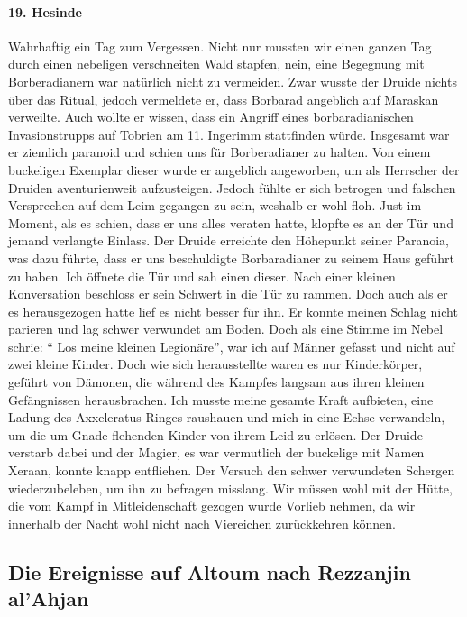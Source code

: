 \paragraph{19. Hesinde}
Wahrhaftig ein Tag zum Vergessen. Nicht nur mussten wir einen ganzen Tag durch einen nebeligen verschneiten Wald stapfen, nein, eine Begegnung mit Borberadianern war natürlich nicht zu vermeiden. Zwar wusste der Druide nichts über das Ritual, jedoch vermeldete er, dass Borbarad angeblich auf Maraskan verweilte. Auch wollte er wissen, dass ein Angriff eines borbaradianischen Invasionstrupps auf Tobrien am 11. Ingerimm stattfinden würde. Insgesamt war er ziemlich paranoid und schien uns für Borberadianer zu halten. Von einem buckeligen Exemplar dieser wurde er angeblich angeworben, um als Herrscher der Druiden aventurienweit aufzusteigen. Jedoch fühlte er sich betrogen und falschen Versprechen auf dem Leim gegangen zu sein, weshalb er wohl floh. Just im Moment, als es schien, dass er uns alles veraten hatte, klopfte es an der Tür und jemand verlangte Einlass. Der Druide erreichte den Höhepunkt seiner Paranoia, was dazu führte, dass er uns beschuldigte Borbaradianer zu seinem Haus geführt zu haben. Ich öffnete die Tür und sah einen dieser. Nach einer kleinen Konversation beschloss er sein Schwert in die Tür zu rammen. Doch auch als er es herausgezogen hatte lief es nicht besser für ihn. Er konnte meinen Schlag nicht parieren und lag schwer verwundet am Boden. Doch als eine Stimme im Nebel schrie: `` Los meine kleinen Legionäre'', war ich auf Männer gefasst und nicht auf zwei kleine Kinder. Doch wie sich herausstellte waren es nur Kinderkörper, geführt von Dämonen, die während des Kampfes langsam aus ihren kleinen Gefängnissen herausbrachen. Ich musste meine gesamte Kraft aufbieten, eine Ladung des Axxeleratus Ringes raushauen und mich in eine Echse verwandeln, um die um Gnade flehenden Kinder von ihrem Leid zu erlösen. Der Druide verstarb dabei und der Magier, es war vermutlich der buckelige mit Namen Xeraan, konnte knapp entfliehen. Der Versuch den schwer verwundeten Schergen wiederzubeleben, um ihn zu befragen misslang. Wir müssen wohl mit der Hütte, die vom Kampf in Mitleidenschaft gezogen wurde Vorlieb nehmen, da wir innerhalb der Nacht wohl nicht nach Viereichen zurückkehren können.

\subsection{Die Ereignisse auf Altoum nach Rezzanjin al'Ahjan}

